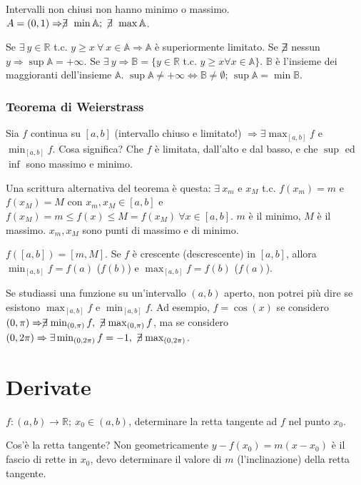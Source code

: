 \documentclass[12pt,a4paper]{article}
\begin{document}
Intervalli non chiusi non hanno minimo o massimo.
$ A = (0,1) \Rightarrow \centernot \exists \ \min \mathbb{A} ; \
\centernot \exists \ \max \mathbb{A} $.

Se $ \exists \ y \in \mathbb{R} $ t.c. $y \geq x \ \forall \ x 
\in \mathbb{A} \Rightarrow \mathbb{A} $ \`e superiormente limitato. 
Se $\centernot \exists$ nessun $y \Rightarrow \sup \mathbb{A} = +\infty$. 
Se $ \exists \ y \Rightarrow \mathbb{B} = \{ y \in \mathbb{R} $ t.c.
$ y \geq x \forall x \in \mathbb{A} \} $. $\mathbb{B}$ \`e 
l'insieme dei maggioranti dell'insieme $\mathbb{A}$.
$\sup \mathbb{A} \neq + \infty \Leftrightarrow \mathbb{B} \neq \emptyset $;
 $ \sup \mathbb{A} = \min \mathbb{B} $.

\subsubsection{Teorema di Weierstrass}
Sia $ f $ continua su $ [a,b] $ (intervallo chiuso e limitato!) 
$ \Rightarrow \exists \max_{[a,b]} f $ e $ \min_{[a,b]} f $.
Cosa significa? Che $f$ \`e limitata, dall'alto e dal basso, e che
$ \sup $ ed $ \inf $ sono massimo e minimo.

Una scrittura alternativa del teorema \`e questa:
$ \exists \ x_m $ e $ x_M $ t.c. $ f(x_m) = m $ e $ f(x_M) = M $
con $ x_m, x_M \in [a,b] $ e $ f(x_M) = m \leq f(x) \leq M = f(x_M)
\ \forall x \in [a,b] $. $m$ \`e il minimo, $M$ \`e il massimo.
$x_m, x_M$ sono punti di massimo e di minimo.

$f([a,b]) = [m,M]$. Se $f$ \`e crescente (descrescente) in $[a,b]$,
allora $\min_{[a,b]} f = f(a)$ ($f(b)$) e $ \max_{[a,b]} f =
f(b)$ ($f(a)$).

Se studiassi una funzione su un'intervallo $(a,b)$ aperto,
non potrei pi\`u dire se esistono $ \max_{[a,b]}f $ e 
$\min_{[a,b]}f$. Ad esempio, $f = \cos(x)$ se considero
$(0,\pi) \Rightarrow \centernot \exists \min_{(0,\pi)}f, \ 
\centernot \exists \max_{(0,\pi)}f$, ma se considero $ (0,2 \pi)
\Rightarrow \exists \min_{(0,2 \pi)}f = -1, \ \centernot
\exists \max_{(0,2 \pi)}$.

\newpage
\section{Derivate}

$ f: (a,b) \to \mathbb{R} ; \ x_0 \in (a,b) $, determinare
la retta tangente ad $f$ nel punto $x_0$.

Cos'\`e la retta tangente? Non geometricamente $y-f(x_0) = m(x-x_0)$
\`e il fascio di rette in $x_0$, devo determinare il valore di $m$
(l'inclinazione) della retta tangente.
\end{document}

